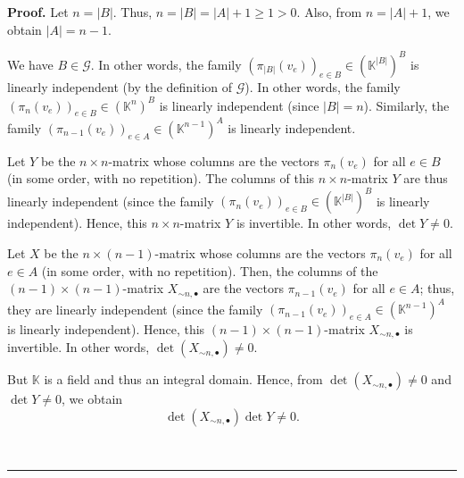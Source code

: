 \documentclass[numbers=enddot,12pt,final,onecolumn,notitlepage]{scrartcl}%
\theoremstyle{definition}
\newenvironment{proof}[1][Proof]{\noindent\textbf{#1.} }{\ \rule{0.5em}{0.5em}}
\renewcommand{\geq}{\geqslant}
\theoremstyle{plainsl}
\begin{document}
\begin{proof}
Let $n=\left\vert B\right\vert $. Thus, $n=\left\vert B\right\vert =\left\vert
A\right\vert +1\geq1>0$. Also, from $n=\left\vert A\right\vert +1$, we obtain
$\left\vert A\right\vert =n-1$.

We have $B\in\mathcal{G}$. In other words, the family $\left(  \pi_{\left\vert
B\right\vert }\left(  v_{e}\right)  \right)  _{e\in B}\in\left(
\mathbb{K}^{\left\vert B\right\vert }\right)  ^{B}$ is linearly independent
(by the definition of $\mathcal{G}$). In other words, the family $\left(
\pi_{n}\left(  v_{e}\right)  \right)  _{e\in B}\in\left(  \mathbb{K}%
^{n}\right)  ^{B}$ is linearly independent (since $\left\vert B\right\vert
=n$). Similarly, the family $\left(  \pi_{n-1}\left(  v_{e}\right)  \right)
_{e\in A}\in\left(  \mathbb{K}^{n-1}\right)  ^{A}$ is linearly independent.

Let $Y$ be the $n\times n$-matrix whose columns are the vectors $\pi
_{n}\left(  v_{e}\right)  $ for all $e\in B$ (in some order, with no
repetition). The columns of this $n\times n$-matrix $Y$ are thus linearly
independent (since the family $\left(  \pi_{n}\left(  v_{e}\right)  \right)
_{e\in B}\in\left(  \mathbb{K}^{\left\vert B\right\vert }\right)  ^{B}$ is
linearly independent). Hence, this $n\times n$-matrix $Y$ is invertible. In
other words, $\det Y\neq0$.

Let $X$ be the $n\times\left(  n-1\right)  $-matrix whose columns are the
vectors $\pi_{n}\left(  v_{e}\right)  $ for all $e\in A$ (in some order, with
no repetition). Then, the columns of the $\left(  n-1\right)  \times\left(
n-1\right)  $-matrix $X_{\sim n,\bullet}$ are the vectors $\pi_{n-1}\left(
v_{e}\right)  $ for all $e\in A$; thus, they are linearly independent (since
the family $\left(  \pi_{n-1}\left(  v_{e}\right)  \right)  _{e\in A}%
\in\left(  \mathbb{K}^{n-1}\right)  ^{A}$ is linearly independent). Hence,
this $\left(  n-1\right)  \times\left(  n-1\right)  $-matrix $X_{\sim
n,\bullet}$ is invertible. In other words, $\det\left(  X_{\sim n,\bullet
}\right)  \neq0$.

But $\mathbb{K}$ is a field and thus an integral domain. Hence, from
$\det\left(  X_{\sim n,\bullet}\right)  \neq0$ and $\det Y\neq0$, we obtain%
\begin{equation}
\det\left(  X_{\sim n,\bullet}\right)  \det Y\neq0.
\label{pf.thm.gog.strong.iv.3}%
\end{equation}



\end{proof}
\end{document}
